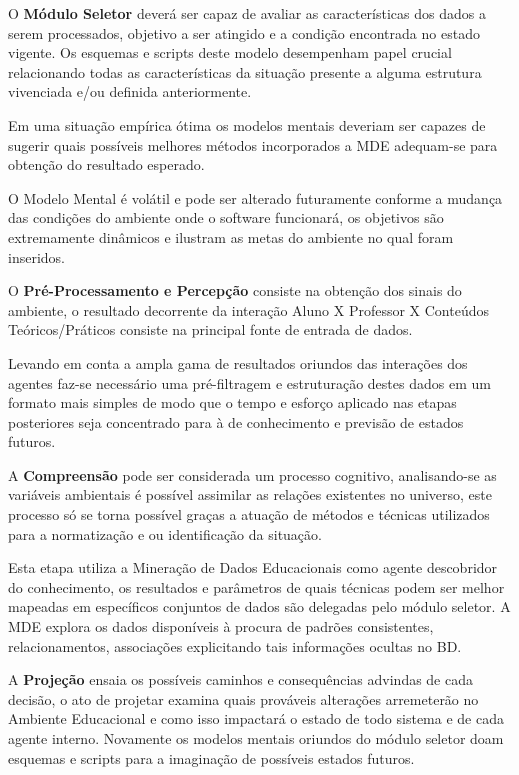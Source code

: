 \documentclass[12pt]{article}
\begin{document}
O \textbf{Módulo Seletor} deverá ser capaz de avaliar as características dos dados a serem processados, objetivo a ser atingido e a condição encontrada no estado vigente. Os esquemas e scripts deste modelo desempenham papel crucial relacionando todas as características da situação presente a alguma estrutura vivenciada e/ou definida anteriormente. 

Em uma situação empírica ótima os modelos mentais deveriam ser capazes de sugerir quais possíveis melhores métodos incorporados a MDE adequam-se para obtenção do resultado esperado. 

O Modelo Mental é volátil e pode ser alterado futuramente conforme a mudança das condições do ambiente onde o software funcionará, os objetivos são extremamente dinâmicos e ilustram as metas do ambiente no qual foram inseridos. 

O \textbf{Pré-Processamento e Percepção} consiste na obtenção dos sinais do ambiente, o resultado decorrente da interação Aluno X Professor X Conteúdos Teóricos/Práticos consiste na principal fonte de entrada de dados. 

Levando em conta a ampla gama de resultados oriundos das interações dos agentes faz-se necessário uma pré-filtragem e estruturação destes dados em um formato mais simples de modo que o tempo e esforço aplicado nas etapas posteriores seja concentrado para à de conhecimento e previsão de estados futuros. 

A \textbf{Compreensão} pode ser considerada um processo cognitivo, analisando-se as variáveis ambientais é possível assimilar as relações existentes no universo, este processo só se torna possível graças a atuação de métodos e técnicas utilizados para a normatização e ou identificação da situação.

Esta etapa utiliza a Mineração de Dados Educacionais como agente descobridor do conhecimento, os resultados e parâmetros de quais técnicas podem ser melhor mapeadas em específicos conjuntos de dados são delegadas pelo módulo seletor. A MDE explora os dados disponíveis à procura de padrões consistentes, relacionamentos, associações explicitando tais informações ocultas no BD.

A \textbf{Projeção} ensaia os possíveis caminhos e consequências advindas de cada decisão, o ato de projetar examina quais prováveis alterações arremeterão no Ambiente Educacional e como isso impactará o estado de todo sistema e de cada agente interno. Novamente os modelos mentais oriundos do módulo seletor doam esquemas e scripts para a imaginação de possíveis estados futuros.
\end{document}
